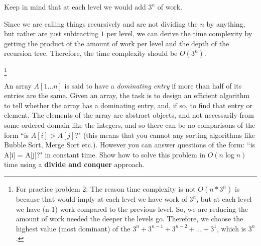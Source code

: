 \documentclass[11pt,answers]{exam}
\begin{document}
\begin{questions}
\begin{parts}
\begin{solution}
Keep in mind that at each level we would add $3^n$ of work. 

Since we are calling things recursively and are not dividing the $n$ by anything, but rather are just subtracting $1$ per level, we can derive the time complexity by getting the product of the amount of work per level and the depth of the recursion tree. Therefore, the time complexity should be $O(3^n)$.
        \end{solution}
        \footnote{For practice problem 2: The reason time complexity is not $O(n*3^n)$ is because that would imply at each level we have work of $3^n$, but at each level we have (n-1) work compared to the previous level. So, we are reducing the amount of work needed the deeper the levels go. Therefore, we choose the highest value (most dominant) of the $3^n+3^{n-1}+3^{n-2}+...+3^1$, which is $3^n$.}
          \end{parts}

  
		\question[7] An array $A[1 \ldots n]$ is said to have a \emph{dominating entry}
  if more than half of its entries are the same.  Given an array, the task is
  to design an efficient algorithm to tell whether the array has a dominating
  entry, and, if so, to find that entry or element.  The elements of the array
  are abstract objects, and not necessarily from some ordered domain like the
  integers, and so there can be no comparisons of the form ``is $A[i] >
  A[j]$?" (this means that you cannot any sorting algorithms like Bubble Sort, Merge Sort etc.). However you can answer questions of the form: ``is A[i] = A[j]?" in
  constant time.  Show how to solve this problem in $O(n\log n)$ time using a \textbf{divide and conquer} approach.  
\end{questions}
\end{document}

